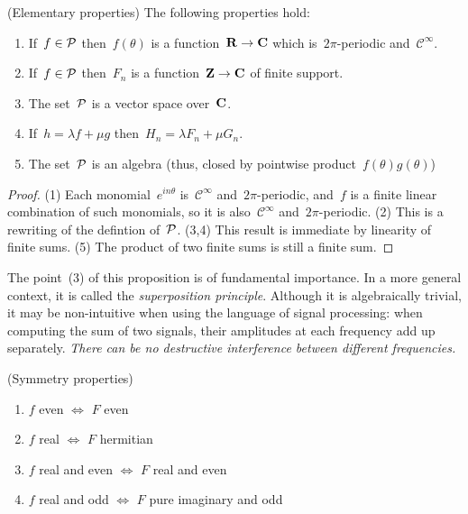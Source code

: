 \begin{proposition}\label{prp:elementary}
(Elementary properties)
The following properties hold:
\begin{enumerate}
	\item If~$f\in\mathcal{P}$ then~$f(\theta)$ is a
		function~$\mathbf{R}\to\mathbf{C}$ which is~$2\pi$-periodic
		and~$\mathcal{C}^\infty$.
	\item If~$f\in\mathcal{P}$ then~$F_n$ is a function~$\mathbf{Z}\to\mathbf{C}$ of finite
		support.
	\item The set~$\mathcal{P}$ is a vector space over~$\mathbf{C}$.
	\item If~$h=\lambda f+\mu g$ then~$H_n=\lambda F_n+\mu G_n$.
	\item The set~$\mathcal{P}$ is an algebra (thus, closed by
		pointwise product~$f(\theta)g(\theta)$)
\end{enumerate}
\end{proposition}

\begin{proof}
(1) Each monomial~$e^{in\theta}$ is~$\mathcal{C}^\infty$
	and~$2\pi$-periodic, and~$f$ is a finite linear
	combination of such monomials, so it is
	also~$\mathcal{C}^\infty$ and~$2\pi$-periodic.
(2) This is a rewriting of the defintion of~$\mathcal{P}$.
(3,4) This result is immediate by linearity of finite sums.
(5) The product of two finite sums is still a finite sum.
\end{proof}

The point~(3) of this proposition is of fundamental importance.  In a more
general context, it is called the \emph{superposition principle}.  Although it
is algebraically trivial, it may be non-intuitive when using the language of
signal processing: when computing the sum of two signals, their amplitudes at
each frequency add up separately. \emph{There can be no destructive
interference between different frequencies.}

\begin{proposition}(Symmetry properties)
\begin{enumerate}
	\item $f$ even $\iff$ $F$ even
	\item $f$ real $\iff$ $F$ hermitian
	\item $f$ real and even $\iff$ $F$ real and even
	\item $f$ real and odd $\iff$ $F$ pure imaginary and odd
\end{enumerate}
\end{proposition}


